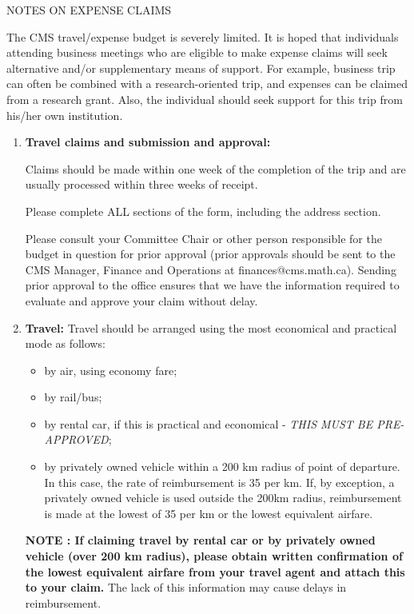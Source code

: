 \documentclass[10pt]{report}
\begin{document}
\newpage


\begin{center}
  NOTES ON EXPENSE CLAIMS
\end{center}

The CMS travel/expense budget is severely limited. It is hoped that
individuals attending business meetings who are eligible to make
expense claims will seek alternative and/or supplementary means of
support. For example, business trip can often be combined with a
research-oriented trip, and expenses can be claimed from a research
grant. Also, the individual should seek support for this trip from
his/her own institution.
\begin{enumerate}
\item
  {\bf Travel claims and submission and approval:}

  Claims should be made within one week of the completion of the trip
  and are usually processed within three weeks of receipt.

  Please complete ALL sections of the form, including the address section.

  Please consult your Committee Chair or other person responsible for
  the budget in question for prior approval (prior approvals should be
  sent to the CMS Manager, Finance and Operations at
  finances@cms.math.ca). Sending prior approval to the office ensures
  that we have the information required to evaluate and approve your
  claim without delay.

\item {\bf Travel:} Travel should be arranged using the most
  economical and practical mode as follows:
\begin{itemize}
  \item by air, using economy fare;
  \item by rail/bus;
  \item by rental car, if this is practical and economical -
    \emph{THIS MUST BE PRE-APPROVED};
  \item by privately owned vehicle within a 200 km radius of point of
    departure. In this case, the rate of reimbursement is
    35\textcent{} per km. If, by exception, a privately owned vehicle
    is used outside the 200km radius, reimbursement is made at the
    lowest of 35\textcent{} per km or the lowest equivalent airfare.
\end{itemize}
{\bf NOTE : If claiming travel by rental car or by privately owned
  vehicle (over 200 km radius), please obtain written confirmation of
  the lowest equivalent airfare from your travel agent and attach this
  to your claim.} The lack of this information may cause delays in
reimbursement.


\end{enumerate}
\end{document}
